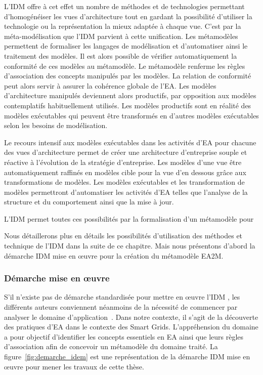     L'IDM offre à cet effet un nombre de méthodes et de technologies permettant d’homogénéiser
    les vues d'architecture tout en gardant la possibilité d'utiliser la technologie ou la représentation
    la mieux adaptée à chaque vue.
    C'est par la méta-modélisation que l'IDM parvient à cette unification. Les métamodèles
    permettent de formaliser les langages de modélisation  et d'automatiser ainsi
    le traitement des modèles.
    Il est alors possible de vérifier automatiquement la conformité de ces modèles au métamodèle.
    Le métamodèle renferme les règles d'association des concepts manipulés par les modèles.
    La relation de conformité peut alors servir à assurer la cohérence globale de l'EA.
    Les modèles d'architecture manipulés deviennent alors productifs,
    par opposition aux modèles contemplatifs habituellement utilisés. Les modèles productifs sont
    en réalité des modèles exécutables qui peuvent être transformés en d'autres modèles exécutables
    selon les besoins de modélisation.

    Le recours intensif aux modèles exécutables dans les activités d'EA
    pour chacune des vues d'architecture permet de créer une architecture d'entreprise
    souple et réactive à l'évolution de la stratégie d'entreprise. Les modèles d'une vue être automatiquement
    raffinés en modèles cible pour la vue d'en dessous grâce aux transformations de modèles. Les modèles
    exécutables et les transformation de modèles permettront d'automatiser
    les activités d'EA telles que l'analyse de la structure et du comportement
    ainsi que la mise à jour.

    L'IDM permet toutes ces possibilités par la formalisation d'un métamodèle pour

    Nous détaillerons plus en détails les possibilités d'utilisation des méthodes et technique de l'IDM
    dans la suite de ce chapitre. Mais nous présentons d'abord la démarche IDM mise en
    œuvre pour la création du métamodèle EA2M.

    \subsubsection{Démarche mise en œuvre}

    S'il n'existe pas de démarche standardisée pour mettre en œuvre
    l'IDM \cite{barbier13phd}, les différents auteurs conviennent néanmoins de la
    nécessité  de commencer par analyser le domaine d'application~\cite{jezequel2012ingenierie}.
    Dans notre contexte, il s'agit de la découverte des pratiques
    d'EA dans le contexte des Smart Grids. L’appréhension du domaine a
    pour objectif d'identifier les concepts essentiels en EA ainsi que leurs
    règles d'association afin de concevoir un métamodèle du domaine traité. La
    figure~\ref{fig:demarche_idem} est une représentation de la démarche IDM
    mise en œuvre pour mener les travaux de cette thèse.


